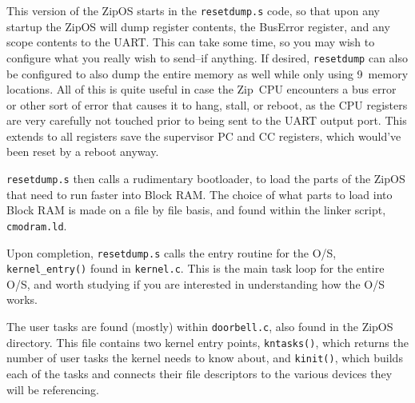 \documentclass{gqtekspec}
\begin{document}
This version of the ZipOS starts in the {\tt resetdump.s} code, so that upon
any startup the ZipOS will dump register contents, the BusError register, and
any scope contents to the UART.  This can take some time, so you may wish to
configure what you really wish to send--if anything.  If desired,
{\tt resetdump} can also be configured to also dump the entire memory as well
while only using 9~memory locations.  All of this is quite useful in case the
Zip~CPU encounters a bus error or other sort of error that causes it to hang,
stall, or reboot, as the CPU registers are very carefully not touched prior to
being sent to the UART output port.  This extends to all registers save the
supervisor PC and CC registers, which would've been reset by a reboot anyway.

{\tt resetdump.s} then calls a rudimentary bootloader, to load the parts of
the ZipOS that need to run faster into Block RAM.  The choice of what parts
to load into Block RAM is made on a file by file basis, and found within
the linker script, {\tt cmodram.ld}.

Upon completion, {\tt resetdump.s} calls the entry routine for the O/S,
{\tt kernel\_entry()} found in {\tt kernel.c}.  This is the main task loop for
the entire O/S, and worth studying if you are interested in understanding how
the O/S works.

The user tasks are found (mostly) within {\tt doorbell.c}, also found in the
ZipOS directory.  This file contains two kernel entry points, {\tt kntasks()},
which returns the number of user tasks the kernel needs to know about, and
{\tt kinit()}, which builds each of the tasks and connects their file 
descriptors to the various devices they will be referencing.
\end{document}

